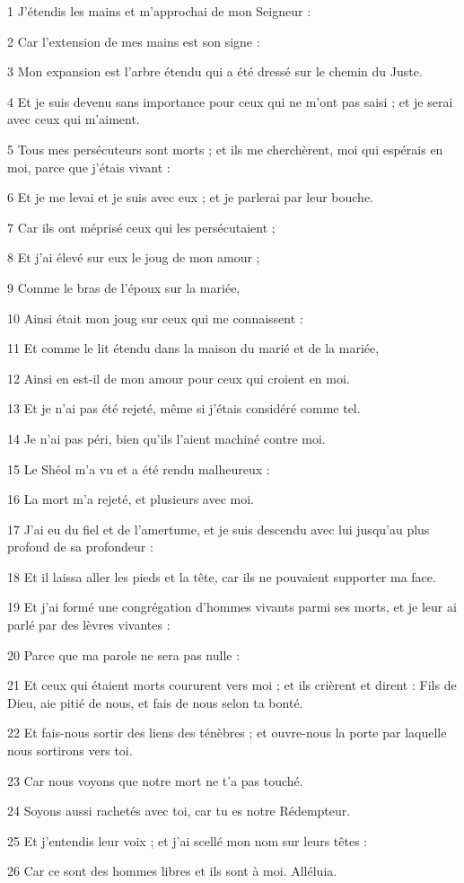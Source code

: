 \par 1 J'étendis les mains et m'approchai de mon Seigneur :
\par 2 Car l'extension de mes mains est son signe :
\par 3 Mon expansion est l'arbre étendu qui a été dressé sur le chemin du Juste.
\par 4 Et je suis devenu sans importance pour ceux qui ne m'ont pas saisi ; et je serai avec ceux qui m'aiment.
\par 5 Tous mes persécuteurs sont morts ; et ils me cherchèrent, moi qui espérais en moi, parce que j'étais vivant :
\par 6 Et je me levai et je suis avec eux ; et je parlerai par leur bouche.
\par 7 Car ils ont méprisé ceux qui les persécutaient ;
\par 8 Et j'ai élevé sur eux le joug de mon amour ;
\par 9 Comme le bras de l'époux sur la mariée,
\par 10 Ainsi était mon joug sur ceux qui me connaissent :
\par 11 Et comme le lit étendu dans la maison du marié et de la mariée,
\par 12 Ainsi en est-il de mon amour pour ceux qui croient en moi.
\par 13 Et je n'ai pas été rejeté, même si j'étais considéré comme tel.
\par 14 Je n'ai pas péri, bien qu'ils l'aient machiné contre moi.
\par 15 Le Shéol m'a vu et a été rendu malheureux :
\par 16 La mort m'a rejeté, et plusieurs avec moi.
\par 17 J'ai eu du fiel et de l'amertume, et je suis descendu avec lui jusqu'au plus profond de sa profondeur :
\par 18 Et il laissa aller les pieds et la tête, car ils ne pouvaient supporter ma face.
\par 19 Et j'ai formé une congrégation d'hommes vivants parmi ses morts, et je leur ai parlé par des lèvres vivantes :
\par 20 Parce que ma parole ne sera pas nulle :
\par 21 Et ceux qui étaient morts coururent vers moi ; et ils crièrent et dirent : Fils de Dieu, aie pitié de nous, et fais de nous selon ta bonté.
\par 22 Et fais-nous sortir des liens des ténèbres ; et ouvre-nous la porte par laquelle nous sortirons vers toi.
\par 23 Car nous voyons que notre mort ne t'a pas touché.
\par 24 Soyons aussi rachetés avec toi, car tu es notre Rédempteur.
\par 25 Et j'entendis leur voix ; et j'ai scellé mon nom sur leurs têtes :
\par 26 Car ce sont des hommes libres et ils sont à moi. Alléluia.


